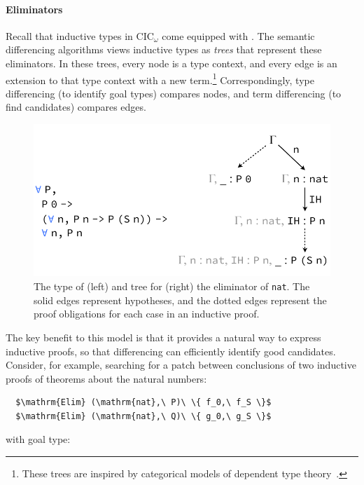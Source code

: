 \paragraph{Eliminators} %
Recall that inductive types in CIC$_{\omega}$ come equipped with .
The semantic differencing algorithms views inductive types as \emph{trees} that represent these eliminators.
In these trees, every node is a type context, and every edge is an extension to that type context 
with a new term.\footnote{These trees are inspired by categorical models of dependent type theory~\cite{Hofmann97}.}
Correspondingly, type differencing (to identify goal types) compares nodes, 
and term differencing (to find candidates) compares edges. 

\begin{figure}[t]
\begin{center}
\includegraphics[scale=0.55]{repair/nat_ind}
\end{center}
\caption{The type of (left) and tree for (right) the eliminator of \lstinline{nat}. The solid edges represent hypotheses, and the dotted edges represent the proof obligations for each case in an inductive proof.} %
\label{fig:cattree}
\end{figure}

The key benefit to this model is that it provides a natural way to express inductive proofs, so
that differencing can efficiently identify good candidates.
Consider, for example, searching for a patch between conclusions of two inductive proofs of theorems about the natural numbers:

\begin{lstlisting}
  $\mathrm{Elim} (\mathrm{nat},\ P)\ \{ f_0,\ f_S \}$
  $\mathrm{Elim} (\mathrm{nat},\ Q)\ \{ g_0,\ g_S \}$ 
\end{lstlisting}
with goal type:


